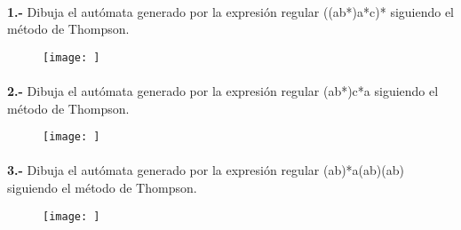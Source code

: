 \documentclass[11pt,a4paper]{report}
\begin{document}
\paragraph{}

\paragraph{}
\textbf{1.-} Dibuja el autómata generado por la expresión regular ((a\textbar b*)a*c)* siguiendo el método de Thompson.
\begin{figure}[ht!]
\centering
\texttt{[image: ]}
\end{figure}\paragraph{}
\textbf{2.-} Dibuja el autómata generado por la expresión regular (a\textbar b*)c*a siguiendo el método de Thompson.
\begin{figure}[ht!]
\centering
\texttt{[image: ]}
\end{figure}\paragraph{}
\textbf{3.-} Dibuja el autómata generado por la expresión regular (a\textbar b)*a(a\textbar b)(a\textbar b) siguiendo el método de Thompson.
\begin{figure}[ht!]
\centering
\texttt{[image: ]}
\end{figure}
\end{document}
